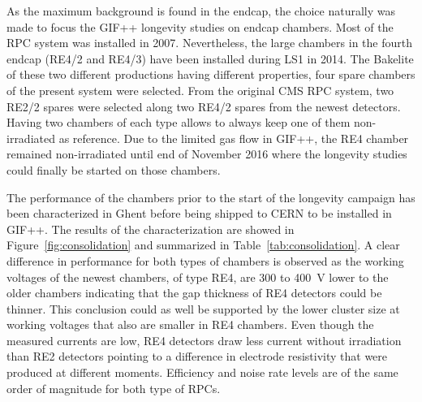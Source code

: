     As the maximum background is found in the endcap, the choice naturally was made to focus the GIF++ longevity studies on endcap chambers. Most of the RPC system was installed in 2007. Nevertheless, the large chambers in the fourth endcap (RE4/2 and RE4/3) have been installed during LS1 in 2014. The Bakelite of these two different productions having different properties, four spare chambers of the present system were selected. From the original CMS RPC system, two RE2/2 spares were selected along two RE4/2 spares from the newest detectors. Having two chambers of each type allows to always keep one of them non-irradiated as reference. Due to the limited gas flow in GIF++, the RE4 chamber remained non-irradiated until end of November 2016 where the longevity studies could finally be started on those chambers.
    
    The performance of the chambers prior to the start of the longevity campaign has been characterized in Ghent before being shipped to CERN to be installed in GIF++. The results of the characterization are showed in Figure~\ref{fig:consolidation} and summarized in Table~\ref{tab:consolidation}. A clear difference in performance for both types of chambers is observed as the working voltages of the newest chambers, of type RE4, are 300 to \SI{400}{V} lower to the older chambers indicating that the gap thickness of RE4 detectors could be thinner. This conclusion could as well be supported by the lower cluster size at working voltages that also are smaller in RE4 chambers. Even though the measured currents are low, RE4 detectors draw less current without irradiation than RE2 detectors pointing to a difference in electrode resistivity that were produced at different moments. Efficiency and noise rate levels are of the same order of magnitude for both type of RPCs.
	
